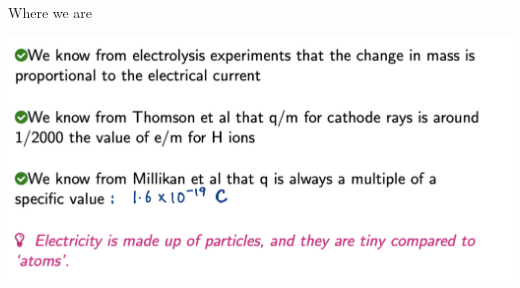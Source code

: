 \begin{frame}{Where we are}
\small
\begin{center}
\includegraphics[scale=0.25]{summary}
\end{center}
\end{frame}


 
